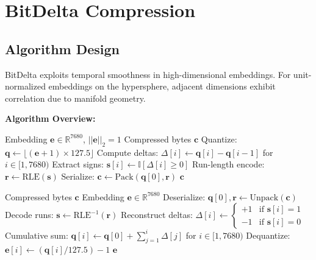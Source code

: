 \section{BitDelta Compression}


\subsection{Algorithm Design}

BitDelta exploits temporal smoothness in high-dimensional embeddings. For unit-normalized embeddings on the hypersphere, adjacent dimensions exhibit correlation due to manifold geometry.

\textbf{Algorithm Overview:}

\begin{algorithm}[H]
\caption{BitDelta Compression}
\label{alg:bitdelta-compress}
\begin{algorithmic}[1]
\REQUIRE Embedding $\mathbf{e} \in \mathbb{R}^{7680}$, $||\mathbf{e}||_2 = 1$
\ENSURE Compressed bytes $\mathbf{c}$
\STATE Quantize: $\mathbf{q} \gets \lfloor (\mathbf{e} + 1) \times 127.5 \rfloor$ 
\STATE Compute deltas: $\Delta[i] \gets \mathbf{q}[i] - \mathbf{q}[i-1]$ for $i \in [1, 7680)$
\STATE Extract signs: $\mathbf{s}[i] \gets \mathbb{I}[\Delta[i] \geq 0]$ 
\STATE Run-length encode: $\mathbf{r} \gets \text{RLE}(\mathbf{s})$
\STATE Serialize: $\mathbf{c} \gets \text{Pack}(\mathbf{q}[0], \mathbf{r})$
\RETURN $\mathbf{c}$
\end{algorithmic}
\end{algorithm}

\begin{algorithm}[H]
\caption{BitDelta Decompression}
\label{alg:bitdelta-decompress}
\begin{algorithmic}[1]
\REQUIRE Compressed bytes $\mathbf{c}$
\ENSURE Embedding $\mathbf{e} \in \mathbb{R}^{7680}$
\STATE Deserialize: $\mathbf{q}[0], \mathbf{r} \gets \text{Unpack}(\mathbf{c})$
\STATE Decode runs: $\mathbf{s} \gets \text{RLE}^{-1}(\mathbf{r})$
\STATE Reconstruct deltas: $\Delta[i] \gets \begin{cases} +1 & \text{if } \mathbf{s}[i] = 1 \\ -1 & \text{if } \mathbf{s}[i] = 0 \end{cases}$
\STATE Cumulative sum: $\mathbf{q}[i] \gets \mathbf{q}[0] + \sum_{j=1}^{i} \Delta[j]$ for $i \in [1, 7680)$
\STATE Dequantize: $\mathbf{e}[i] \gets (\mathbf{q}[i] / 127.5) - 1$
\RETURN $\mathbf{e}$
\end{algorithmic}
\end{algorithm}

